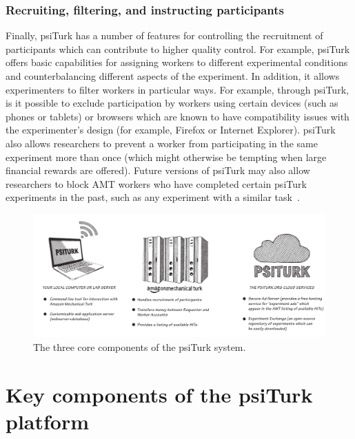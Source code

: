\documentclass[twocolumn]{svjour3}          %
\newcommand{\psiturk}[0]{\textsf{psiTurk}}
\begin{document}


\subsubsection{Recruiting, filtering, and instructing participants}
Finally, \psiturk{} has a number of features for controlling the recruitment
of participants which can contribute to higher quality control.
For example, \psiturk{} offers basic capabilities for assigning workers to different experimental conditions 
and counterbalancing different aspects of the experiment.
In addition, it allows experimenters to filter workers in particular ways.  For example, through \psiturk{},
is it possible to exclude participation by workers using certain devices (such as phones or tablets) or browsers
which are known to have compatibility issues with the experimenter's design (for example,
Firefox or Internet Explorer).  \psiturk{} also allows researchers to prevent a worker from 
participating in the same experiment more than once (which might otherwise be tempting when
large financial rewards are offered).  Future versions of \psiturk{} may also allow researchers to 
block AMT workers who have completed certain \psiturk{} experiments in the past, such as
any experiment with a similar task~\citep[see][for a discussion about non-naivety amongst AMT workers]{chandler2014nonnaivete}.

\begin{figure}[tp]
\centering
\includegraphics[scale=.40]{figures/psiturk-components.pdf}
\caption{The three core components of the \psiturk{} system.  }
\label{fig:components}
\end{figure}


\section{Key components of the \psiturk{} platform}
\end{document}
